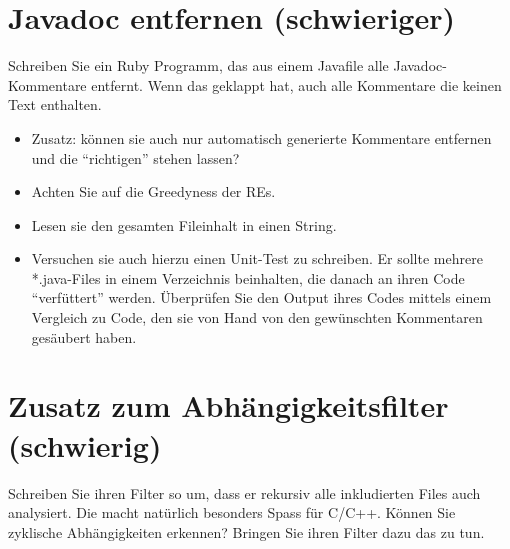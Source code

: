 \documentclass[a4paper,11pt,oneside]{scrbook}
\begin{document}
\section{Javadoc entfernen (schwieriger)} %
\label{sec:javadoc_entfernen}
Schreiben Sie ein Ruby Programm, das aus einem Javafile alle Javadoc-Kommentare entfernt. Wenn das geklappt hat, auch alle Kommentare die keinen Text enthalten.
\begin{itemize}
	\item Zusatz: können sie auch nur automatisch generierte Kommentare entfernen und die “richtigen” stehen lassen?
	\item Achten Sie auf die Greedyness der REs.
	\item Lesen sie den gesamten Fileinhalt in einen String.
	\item Versuchen sie auch hierzu einen Unit-Test zu schreiben. Er sollte mehrere *.java-Files in einem Verzeichnis beinhalten, die danach an ihren Code “verfüttert” werden. Überprüfen Sie den Output ihres Codes mittels einem Vergleich zu Code, den sie von Hand von den gewünschten Kommentaren gesäubert haben.
\end{itemize}

\section{Zusatz zum Abhängigkeitsfilter (schwierig)} %
\label{sec:Zusatz zum Abhängigkeitsfilter}
Schreiben Sie ihren Filter so um, dass er rekursiv alle inkludierten Files auch analysiert. Die macht natürlich besonders Spass für C/C++.
Können Sie zyklische Abhängigkeiten erkennen? Bringen Sie ihren Filter dazu das zu tun.


\end{document}
